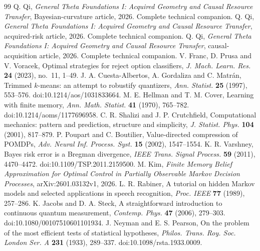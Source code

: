 \begin{thebibliography}{99}
 Q. Qi, \emph{General Theta Foundations I: Acquired Geometry and Causal Resource Transfer}, Bayesian-curvature article, 2026. Complete technical companion.
 Q. Qi, \emph{General Theta Foundations I: Acquired Geometry and Causal Resource Transfer}, acquired-risk article, 2026. Complete technical companion.
 Q. Qi, \emph{General Theta Foundations I: Acquired Geometry and Causal Resource Transfer}, causal-acquisition article, 2026. Complete technical companion.
 V. Franc, D. Prusa and V. Voracek, Optimal strategies for reject option classifiers, \emph{J. Mach. Learn. Res.} \textbf{24} (2023), no.~11, 1--49.
 J. A. Cuesta-Albertos, A. Gordaliza and C. Matr\'an, Trimmed $k$-means: an attempt to robustify quantizers, \emph{Ann. Statist.} \textbf{25} (1997), 553--576. doi:10.1214/aos/1031833664.
 M. E. Hellman and T. M. Cover, Learning with finite memory, \emph{Ann. Math. Statist.} \textbf{41} (1970), 765--782. doi:10.1214/aoms/1177696958.
 C. R. Shalizi and J. P. Crutchfield, Computational mechanics: pattern and prediction, structure and simplicity, \emph{J. Statist. Phys.} \textbf{104} (2001), 817--879.
 P. Poupart and C. Boutilier, Value-directed compression of POMDPs, \emph{Adv. Neural Inf. Process. Syst.} \textbf{15} (2002), 1547--1554.
 K. R. Varshney, Bayes risk error is a Bregman divergence, \emph{IEEE Trans. Signal Process.} \textbf{59} (2011), 4470--4472. doi:10.1109/TSP.2011.2159500.
 M. Kim, \emph{Finite Memory Belief Approximation for Optimal Control in Partially Observable Markov Decision Processes}, arXiv:2601.03132v1, 2026.
 L. R. Rabiner, A tutorial on hidden Markov models and selected applications in speech recognition, \emph{Proc. IEEE} \textbf{77} (1989), 257--286.
 K. Jacobs and D. A. Steck, A straightforward introduction to continuous quantum measurement, \emph{Contemp. Phys.} \textbf{47} (2006), 279--303. doi:10.1080/00107510601101934.
 J. Neyman and E. S. Pearson, On the problem of the most efficient tests of statistical hypotheses, \emph{Philos. Trans. Roy. Soc. London Ser. A} \textbf{231} (1933), 289--337. doi:10.1098/rsta.1933.0009.
\end{thebibliography}
